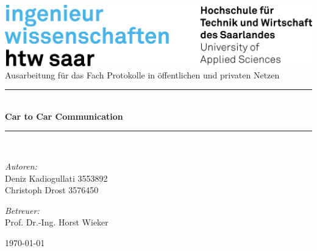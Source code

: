 \documentclass[12pt, a4paper, twoside, openright,ngerman]{scrreprt}
\begin{document}
\begin{titlepage}
		\begin{center}
			\includegraphics[width=.8\linewidth]{content/images/logos/logo_htw.png}\\[1cm]   
			
			\vspace{10 mm}
			Ausarbeitung für das Fach \glqq Protokolle in öffentlichen und privaten Netzen\grqq 
			\vspace{10 mm}	
			
			\newcommand{\HRule}{\rule{\linewidth}{0.5mm}} \HRule \\[0.4cm] { \huge \bfseries Car to Car Communication}\\[0.4cm]
			\HRule \\[1.5cm]

			\begin{minipage}{0.4\textwidth}
				\begin{flushleft} \large
					\emph{Autoren:}\\
					Deniz Kadiogullati 3553892\\
					Christoph Drost 3576450
				\end{flushleft}
			\end{minipage}
			\hfill
			\begin{minipage}{0.4\textwidth}
				\begin{flushright} \large
					\emph{Betreuer:} \\
					Prof. Dr.-Ing. Horst Wieker
				\end{flushright}
			\end{minipage}
			\vfill
			{\large \today}
		\end{center}
	\end{titlepage}


\listoftodos

\tableofcontents
\newpage 

\cleardoublepage




\cleardoublepage
\label{abkuerzungsverzeichnis}
\begin{acronym}[LONGEST]
	
\end{acronym}   	 		

\nocite{*} 

\newpage
\sloppy
\printbibliography 



\newpage
\listoffigures
\end{document}
